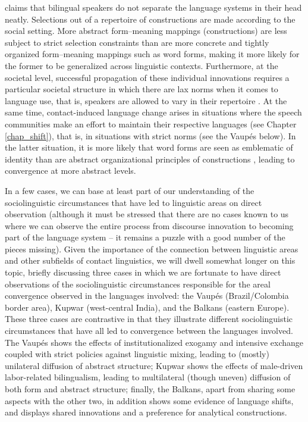 \documentclass[output=paper]{langscibook}
\begin{document}
\textcite{Matras2011Explaining} claims that bilingual speakers do not separate the language systems in their head neatly. Selections out of a repertoire of constructions are made according to the social setting. More abstract form--meaning mappings (constructions) are less subject to strict selection constraints than are more concrete and tightly organized form--meaning mappings such as word forms, making it more likely for the former to be generalized across linguistic contexts. Furthermore, at the societal level, successful propagation of these individual innovations requires a particular societal structure in which there are lax norms when it comes to language use, that is, speakers are allowed to vary in their repertoire \parencite[157]{Matras2011Explaining}. At the same time, contact-induced language change arises in situations where the speech communities make an effort to maintain their respective languages (see Chapter \ref{chap_shift}), that is, in situations with strict norms (see the Vaupés below). In the latter situation, it is more likely that word forms are seen as emblematic of identity than are abstract organizational principles of constructions \parencite{Aikhenvald2002Language}, leading to convergence at more abstract levels. 

In a few cases, we can base at least part of our understanding of the socio\-linguistic circumstances that have led to linguistic areas on direct observation (although it must be stressed that there are no cases known to us where we can observe the entire process from discourse innovation to becoming part of the language system -- it remains a puzzle with a good number of the pieces missing). Given the importance of the connection between linguistic areas and other subfields of contact linguistics, we will dwell somewhat longer on this topic, briefly discussing three cases in which we are fortunate to have direct observations of the socio\-linguistic circumstances responsible for the areal convergence observed in the languages involved: the Vaupés (Brazil/Colombia border area), Kupwar (west-central India), and the Balkans (eastern Europe). These three cases are contrastive in that they illustrate different socio\-linguistic circumstances that have all led to convergence between the languages involved. The Vaupés shows the effects of institutionalized exogamy and intensive exchange coupled with strict policies against linguistic mixing, leading to (mostly) unilateral diffusion of abstract structure; Kupwar shows the effects of male-driven labor-related bilingualism, leading to multilateral (though uneven) diffusion of both form and abstract structure; finally, the Balkans, apart from sharing some aspects with the other two, in addition shows some evidence of language shifts, and displays shared innovations and a preference for analytical constructions.
\end{document}
